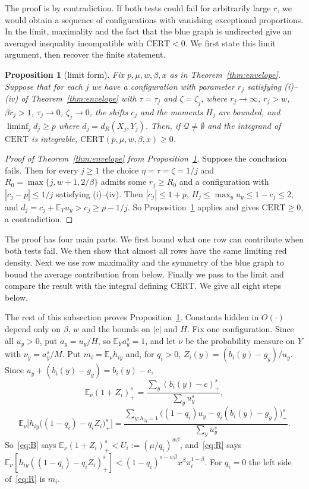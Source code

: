 \documentclass[11pt]{article}
\newtheorem{proposition}[theorem]{Proposition}
\theoremstyle{definition}
\theoremstyle{remark}
\newcommand{\E}{\mathbb{E}}
\newcommand{\cert}{\mathrm{CERT}}
\newcommand{\feas}{\mathcal Q}
\begin{document}
The proof is by contradiction. If both tests could fail for arbitrarily large $r$, we would obtain a sequence
of configurations with vanishing exceptional proportions. In the limit, maximality and the fact that the blue
graph is undirected give an averaged inequality incompatible with $\cert<0$.
We first state this limit argument, then recover the finite statement.

\begin{proposition}[limit form]\label{prop:limit}
Fix $p,\mu,w,\beta,x$ as in Theorem~\ref{thm:envelope}. Suppose that for each $j$ we have a configuration with
parameter $r_j$ satisfying (i)--(iv) of Theorem~\ref{thm:envelope} with $\tau=\tau_j$ and $\zeta=\zeta_j$, where
$r_j\to\infty$, $r_j>w$, $\beta r_j>1$, $\tau_j\to0$, $\zeta_j\to0$, the shifts $c_j$ and the moments $H_j$ are
bounded, and $\liminf_jd_j\ge p$ where $d_j=d_R(X_j,Y_j)$. Then, if $\feas\ne\emptyset$ and the integrand of $\cert$ is
integrable, $\cert(p,\mu,w,\beta,x)\ge0$.
\end{proposition}

\begin{proof}[Proof of Theorem~\ref{thm:envelope} from Proposition~\ref{prop:limit}]
Suppose the conclusion fails. Then for every $j\ge1$ the choice $\eta=\tau=\zeta=1/j$ and
$R_0=\max\{j,w+1,2/\beta\}$ admits some $r_j\ge R_0$ and a configuration with $|c_j-p|\le1/j$ satisfying (i)--(iv).
Then $|c_j|\le1+p$, $H_j\le\max_yu_y\le1-c_j\le2$, and $d_j=c_j+\E_Yu_y>c_j\ge p-1/j$. So
Proposition~\ref{prop:limit} applies and gives $\cert\ge0$, a contradiction.
\end{proof}

The proof has four main parts. We first bound what one row can contribute when both tests fail.
We then show that almost all rows have the same limiting red density.
Next we use row maximality and the symmetry of the blue graph to bound the average contribution from below.
Finally we pass to the limit and compare the result with the integral defining $\cert$.
We give all eight steps below.

The rest of this subsection proves Proposition~\ref{prop:limit}. Constants hidden in $O(\cdot)$ depend only on
$\beta$, $w$ and the bounds on $|c|$ and $H$. Fix one configuration. Since all $u_y>0$, put $a_y=u_y/H$, so $\E_Ya_y^s=1$,
and let $\nu$ be the probability measure on $Y$ with $\nu_y=a_y^s/M$. Put $m_i=\E_\nu h_{iy}$ and, for $q_i>0$,
$Z_i(y)=(b_i(y)-g_y)/u_y$. Since $u_y+(b_i(y)-g_y)=b_i(y)-c$,
\[
\E_\nu(1+Z_i)_+^s=\frac{\sum_y(b_i(y)-c)_+^s}{\sum_yu_y^s},
\]
\[
\E_\nu\Big[h_{iy}\big((1-q_i)-q_iZ_i\big)_+^s\Big]=\frac{\sum_{y:h_{iy}=1}\big((1-q_i)u_y-q_i(b_i(y)-g_y)\big)_+^s}{\sum_yu_y^s}.
\]
So~\eqref{eq:B} says $\E_\nu(1+Z_i)_+^s<U_i:=(\mu/q_i)^{w\beta}$, and~\eqref{eq:R} says
$\E_\nu[h_{iy}((1-q_i)-q_iZ_i)_+^s]<(1-q_i)^{s-w\beta}x^\beta\pi_i^{1-\beta}$. For $q_i=0$ the left side
of~\eqref{eq:R} is $m_i$.
\end{document}
